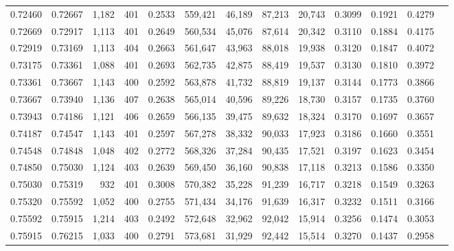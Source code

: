 \begin{tabular}{rrrrrrrrrrrrr}
0.72460 & 0.72667 &  1,182 &   401 &                                     0.2533 & 559,421 &  46,189 &  87,213 &  20,743 & 0.3099 & 0.1921 & 0.4279 \\
0.72669 & 0.72917 &  1,113 &   401 &                                     0.2649 & 560,534 &  45,076 &  87,614 &  20,342 & 0.3110 & 0.1884 & 0.4175 \\
0.72919 & 0.73169 &  1,113 &   404 &                                     0.2663 & 561,647 &  43,963 &  88,018 &  19,938 & 0.3120 & 0.1847 & 0.4072 \\
0.73175 & 0.73361 &  1,088 &   401 &                                     0.2693 & 562,735 &  42,875 &  88,419 &  19,537 & 0.3130 & 0.1810 & 0.3972 \\
0.73361 & 0.73667 &  1,143 &   400 &                                     0.2592 & 563,878 &  41,732 &  88,819 &  19,137 & 0.3144 & 0.1773 & 0.3866 \\
0.73667 & 0.73940 &  1,136 &   407 &                                     0.2638 & 565,014 &  40,596 &  89,226 &  18,730 & 0.3157 & 0.1735 & 0.3760 \\
0.73943 & 0.74186 &  1,121 &   406 &                                     0.2659 & 566,135 &  39,475 &  89,632 &  18,324 & 0.3170 & 0.1697 & 0.3657 \\
0.74187 & 0.74547 &  1,143 &   401 &                                     0.2597 & 567,278 &  38,332 &  90,033 &  17,923 & 0.3186 & 0.1660 & 0.3551 \\
0.74548 & 0.74848 &  1,048 &   402 &                                     0.2772 & 568,326 &  37,284 &  90,435 &  17,521 & 0.3197 & 0.1623 & 0.3454 \\
0.74850 & 0.75030 &  1,124 &   403 &                                     0.2639 & 569,450 &  36,160 &  90,838 &  17,118 & 0.3213 & 0.1586 & 0.3350 \\
0.75030 & 0.75319 &    932 &   401 &                                     0.3008 & 570,382 &  35,228 &  91,239 &  16,717 & 0.3218 & 0.1549 & 0.3263 \\
0.75320 & 0.75592 &  1,052 &   400 &                                     0.2755 & 571,434 &  34,176 &  91,639 &  16,317 & 0.3232 & 0.1511 & 0.3166 \\
0.75592 & 0.75915 &  1,214 &   403 &                                     0.2492 & 572,648 &  32,962 &  92,042 &  15,914 & 0.3256 & 0.1474 & 0.3053 \\
0.75915 & 0.76215 &  1,033 &   400 &                                     0.2791 & 573,681 &  31,929 &  92,442 &  15,514 & 0.3270 & 0.1437 & 0.2958 \\

\end{tabular}
